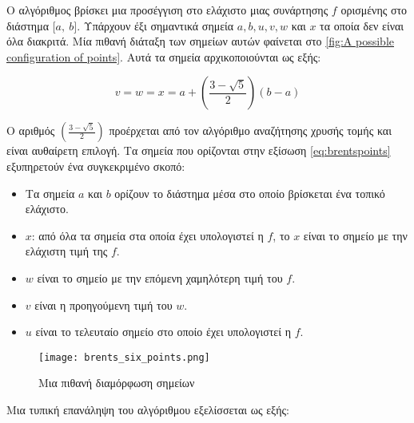 Ο αλγόριθμος βρίσκει μια προσέγγιση στο ελάχιστο μιας συνάρτησης $f$ ορισμένης στο διάστημα $\lbrack a,\ b\rbrack$. Υπάρχουν έξι σημαντικά σημεία $a,b,u,v,w$ και $x$ τα οποία δεν είναι όλα διακριτά. Μία πιθανή διάταξη των σημείων αυτών φαίνεται στο \autoref{fig:A possible configuration of points}. Αυτά τα σημεία αρχικοποιούνται ως εξής:

\begin{equation}
    \label{eq:brentspoints}
v = w = x = a + \left( \frac{3 - \sqrt{5}}{2} \right)(b - a)
\end{equation}

Ο αριθμός $\left( \frac{3 - \sqrt{5}}{2} \right)$ προέρχεται από τον αλγόριθμο αναζήτησης χρυσής τομής και είναι αυθαίρετη επιλογή. Τα σημεία που ορίζονται στην εξίσωση \eqref{eq:brentspoints} εξυπηρετούν ένα συγκεκριμένο σκοπό:

\begin{itemize} 
  \item Τα σημεία $a$ και $b$ ορίζουν το διάστημα μέσα στο οποίο βρίσκεται ένα τοπικό ελάχιστο. 
  \item $x$: από όλα τα σημεία στα οποία έχει υπολογιστεί η $f$, το $x$ είναι το σημείο με την ελάχιστη τιμή της $f$. 
  \item $w$ είναι το σημείο με την επόμενη χαμηλότερη τιμή του $f$. 
  \item $v$ είναι η προηγούμενη τιμή του $w$. 
  \item $u$ είναι το τελευταίο σημείο στο οποίο έχει υπολογιστεί η $f$.
\end{itemize}

\begin{figure}
  \centering
  \texttt{[image: brents\_six\_points.png]}
  \caption{Μια πιθανή διαμόρφωση σημείων  \cite{brent1973} }
  \label{fig:A possible configuration of points}
\end{figure}

Μια τυπική επανάληψη του αλγόριθμου εξελίσσεται ως εξής:


